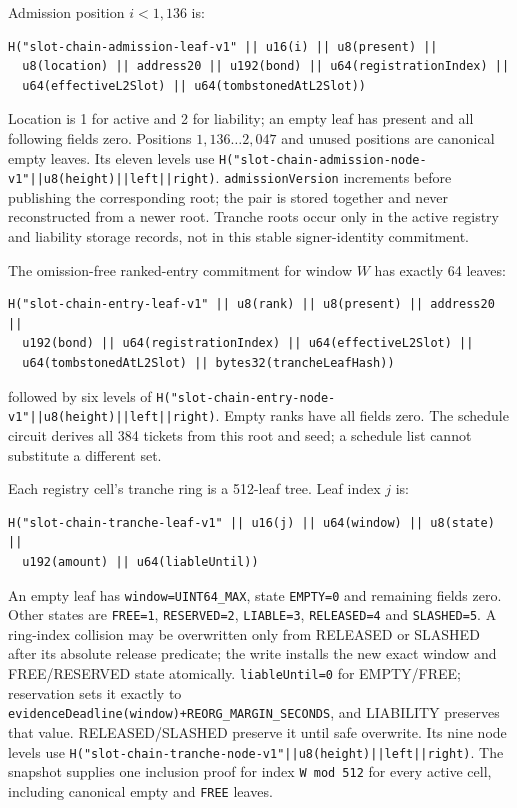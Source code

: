 \documentclass[a4paper,11pt]{article}
\newcommand{\code}[1]{\nolinkurl{#1}}
\begin{document}
Admission position $i<1,136$ is:
\begin{verbatim}
H("slot-chain-admission-leaf-v1" || u16(i) || u8(present) ||
  u8(location) || address20 || u192(bond) || u64(registrationIndex) ||
  u64(effectiveL2Slot) || u64(tombstonedAtL2Slot))
\end{verbatim}
Location is 1 for active and 2 for liability; an empty leaf has present and all
following fields zero.  Positions
$1,136\ldots2,047$ and unused positions are canonical empty leaves.  Its eleven
levels use
\code{H("slot-chain-admission-node-v1"||u8(height)||left||right)}.
\code{admissionVersion} increments before publishing the corresponding root;
the pair is stored together and never reconstructed from a newer root.  Tranche
roots occur only in the active registry and liability storage records, not in
this stable signer-identity commitment.

The omission-free ranked-entry commitment for window $W$ has exactly 64 leaves:
\begin{verbatim}
H("slot-chain-entry-leaf-v1" || u8(rank) || u8(present) || address20 ||
  u192(bond) || u64(registrationIndex) || u64(effectiveL2Slot) ||
  u64(tombstonedAtL2Slot) || bytes32(trancheLeafHash))
\end{verbatim}
followed by six levels of
\code{H("slot-chain-entry-node-v1"||u8(height)||left||right)}.  Empty ranks have
all fields zero.  The schedule circuit derives all 384 tickets from this root
and seed; a schedule list cannot substitute a different set.

Each registry cell's tranche ring is a 512-leaf tree.  Leaf index $j$ is:
\begin{verbatim}
H("slot-chain-tranche-leaf-v1" || u16(j) || u64(window) || u8(state) ||
  u192(amount) || u64(liableUntil))
\end{verbatim}
An empty leaf has \code{window=UINT64_MAX},
state \code{EMPTY=0} and remaining fields zero.  Other states are
\code{FREE=1}, \code{RESERVED=2}, \code{LIABLE=3},
\code{RELEASED=4} and \code{SLASHED=5}.  A ring-index collision may be
overwritten only from RELEASED or SLASHED after its absolute release predicate;
the write installs the new exact window and FREE/RESERVED state atomically.
\code{liableUntil=0} for EMPTY/FREE; reservation sets it exactly to
\code{evidenceDeadline(window)+REORG_MARGIN_SECONDS}, and LIABILITY preserves
that value.  RELEASED/SLASHED preserve it until safe overwrite.
Its nine node levels use
\code{H("slot-chain-tranche-node-v1"||u8(height)||left||right)}.  The snapshot
supplies one inclusion proof for index \code{W mod 512} for every active cell,
including canonical empty and \code{FREE} leaves.
\end{document}
